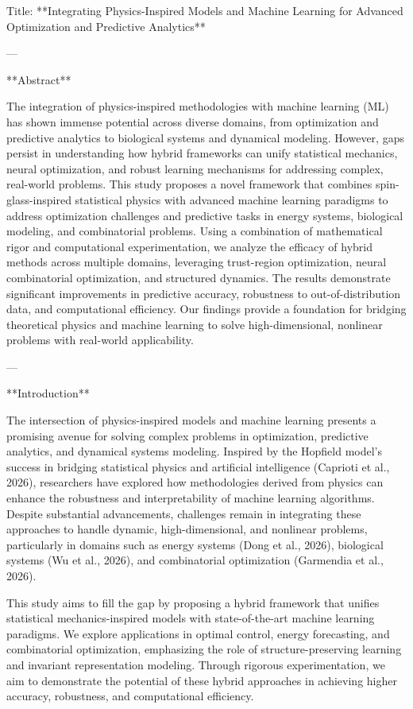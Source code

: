 Title: **Integrating Physics-Inspired Models and Machine Learning for Advanced Optimization and Predictive Analytics**

---

**Abstract**

The integration of physics-inspired methodologies with machine learning (ML) has shown immense potential across diverse domains, from optimization and predictive analytics to biological systems and dynamical modeling. However, gaps persist in understanding how hybrid frameworks can unify statistical mechanics, neural optimization, and robust learning mechanisms for addressing complex, real-world problems. This study proposes a novel framework that combines spin-glass-inspired statistical physics with advanced machine learning paradigms to address optimization challenges and predictive tasks in energy systems, biological modeling, and combinatorial problems. Using a combination of mathematical rigor and computational experimentation, we analyze the efficacy of hybrid methods across multiple domains, leveraging trust-region optimization, neural combinatorial optimization, and structured dynamics. The results demonstrate significant improvements in predictive accuracy, robustness to out-of-distribution data, and computational efficiency. Our findings provide a foundation for bridging theoretical physics and machine learning to solve high-dimensional, nonlinear problems with real-world applicability.

---

**Introduction**

The intersection of physics-inspired models and machine learning presents a promising avenue for solving complex problems in optimization, predictive analytics, and dynamical systems modeling. Inspired by the Hopfield model's success in bridging statistical physics and artificial intelligence (Caprioti et al., 2026), researchers have explored how methodologies derived from physics can enhance the robustness and interpretability of machine learning algorithms. Despite substantial advancements, challenges remain in integrating these approaches to handle dynamic, high-dimensional, and nonlinear problems, particularly in domains such as energy systems (Dong et al., 2026), biological systems (Wu et al., 2026), and combinatorial optimization (Garmendia et al., 2026).

This study aims to fill the gap by proposing a hybrid framework that unifies statistical mechanics-inspired models with state-of-the-art machine learning paradigms. We explore applications in optimal control, energy forecasting, and combinatorial optimization, emphasizing the role of structure-preserving learning and invariant representation modeling. Through rigorous experimentation, we aim to demonstrate the potential of these hybrid approaches in achieving higher accuracy, robustness, and computational efficiency.

